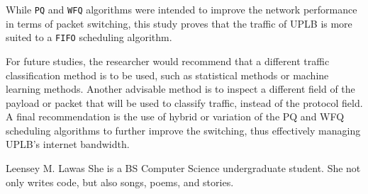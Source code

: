 \documentclass[journal]{IEEE/IEEEtran}
\newcommand{\ADVISEE}{Leensey M. Lawas}
\begin{document}
While \texttt{PQ} and \texttt{WFQ} algorithms were intended to improve the network performance in terms of packet switching, this study proves that the traffic of UPLB is more suited to a \texttt{FIFO} scheduling algorithm.

For future studies, the researcher would recommend that a different traffic classification method is to be used, such as statistical methods or machine learning methods. Another advisable method is to inspect a different field of the payload or packet that will be used to classify traffic, instead of the protocol field. A final recommendation is the use of hybrid or variation of the PQ and WFQ scheduling algorithms to further improve the switching, thus effectively managing UPLB's internet bandwidth.




\begin{biography}{\ADVISEE}
She is a BS Computer Science undergraduate student. She not only writes code, but also songs, poems, and stories.
\end{biography}
\end{document}
